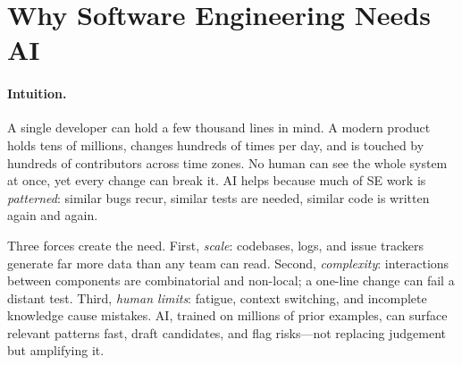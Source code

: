 \section{Why Software Engineering Needs AI}
\label{sec:why-ai}
\paragraph{Intuition.} A single developer can hold a few thousand lines in mind. A modern product holds tens of millions, changes hundreds of times per day, and is touched by hundreds of contributors across time zones. No human can see the whole system at once, yet every change can break it. AI helps because much of SE work is \emph{patterned}: similar bugs recur, similar tests are needed, similar code is written again and again.

Three forces create the need. First, \emph{scale}: codebases, logs, and issue trackers generate far more data than any team can read. Second, \emph{complexity}: interactions between components are combinatorial and non-local; a one-line change can fail a distant test. Third, \emph{human limits}: fatigue, context switching, and incomplete knowledge cause mistakes. AI, trained on millions of prior examples, can surface relevant patterns fast, draft candidates, and flag risks---not replacing judgement but amplifying it.

